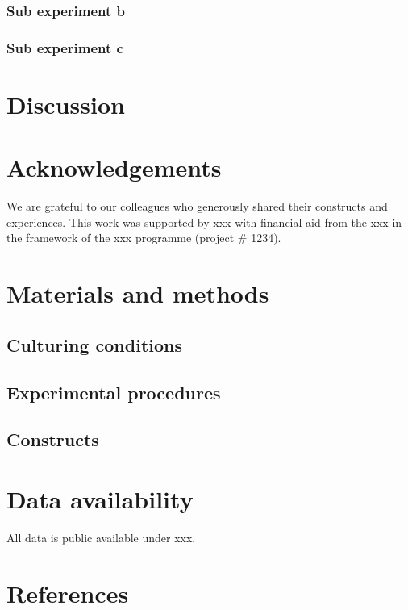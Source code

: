 \documentclass[onecolumn, 11pt,openany]{memoir}
\begin{document}
\begin{multicols}{2}
\subsubsection{Sub experiment b}
\lipsum[1]

\subsubsection{Sub experiment c}
\lipsum[1]

\section{Discussion}
\lipsum[1-6]

\section{Acknowledgements}
We are grateful to our colleagues who generously shared their constructs and experiences. This work was supported by xxx with financial aid from the xxx in the framework of the xxx programme (project \# 1234).

\begin{footnotesize}
\section{Materials and methods}

\subsection{Culturing conditions}
\lipsum[1]

\subsection{Experimental procedures}
\lipsum[1]

\subsection{Constructs}
\lipsum[1]

\section{Data availability}
All data is public available under xxx.

\end{footnotesize}

\section{References}
\setlength\parindent{-0.5 em}
\setlength{\parskip}{0 em}
\setlength{\leftskip}{0.5 em}


\end{multicols}
\end{document}
